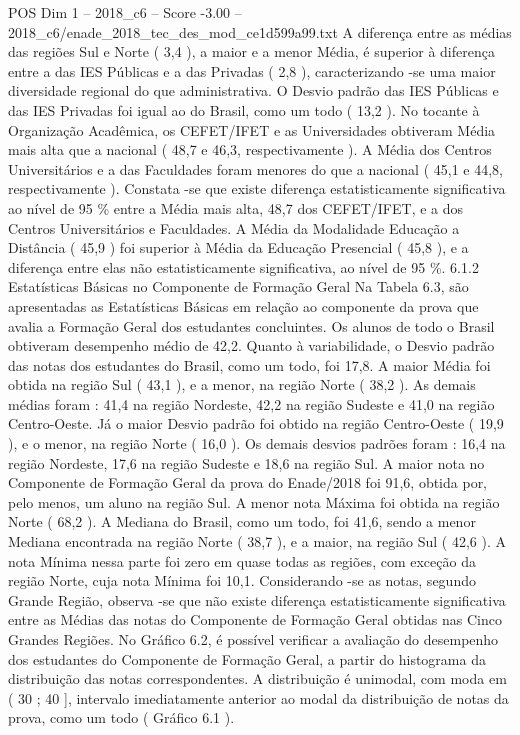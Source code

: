 \begin{textsample}{POS Dim 1 – 2018\_c6 – Score -3.00 – 2018\_c6/enade\_2018\_tec\_des\_mod\_ce1d599a99.txt}
A diferença entre as médias das regiões Sul e Norte ( 3,4 ), a maior e a menor Média, é superior à diferença entre a das IES Públicas e a das Privadas ( 2,8 ), caracterizando -se uma maior diversidade regional do que administrativa.
O Desvio padrão das IES Públicas e das IES Privadas foi igual ao do Brasil, como um todo ( 13,2 ).
No tocante à Organização Acadêmica, os CEFET/IFET e as Universidades obtiveram Média mais alta que a nacional ( 48,7 e 46,3, respectivamente ).
A Média dos Centros Universitários e a das Faculdades foram menores do que a nacional ( 45,1 e 44,8, respectivamente ).
Constata -se que existe diferença estatisticamente significativa ao nível de 95 \% entre a Média mais alta, 48,7 dos CEFET/IFET, e a dos Centros Universitários e Faculdades.
A Média da Modalidade Educação a Distância ( 45,9 ) foi superior à Média da Educação Presencial ( 45,8 ), e a diferença entre elas não estatisticamente significativa, ao nível de 95 \%. 6.1.2 Estatísticas Básicas no Componente de Formação Geral Na Tabela 6.3, são apresentadas as Estatísticas Básicas em relação ao componente da prova que avalia a Formação Geral dos estudantes concluintes.
Os alunos de todo o Brasil obtiveram desempenho médio de 42,2.
Quanto à variabilidade, o Desvio padrão das notas dos estudantes do Brasil, como um todo, foi 17,8.
A maior Média foi obtida na região Sul ( 43,1 ), e a menor, na região Norte ( 38,2 ).
As demais médias foram : 41,4 na região Nordeste, 42,2 na região Sudeste e 41,0 na região Centro-Oeste.
Já o maior Desvio padrão foi obtido na região Centro-Oeste ( 19,9 ), e o menor, na região Norte ( 16,0 ).
Os demais desvios padrões foram : 16,4 na região Nordeste, 17,6 na região Sudeste e 18,6 na região Sul.
A maior nota no Componente de Formação Geral da prova do Enade/2018 foi 91,6, obtida por, pelo menos, um aluno na região Sul.
A menor nota Máxima foi obtida na região Norte ( 68,2 ).
A Mediana do Brasil, como um todo, foi 41,6, sendo a menor Mediana encontrada na região Norte ( 38,7 ), e a maior, na região Sul ( 42,6 ).
A nota Mínima nessa parte foi zero em quase todas as regiões, com exceção da região Norte, cuja nota Mínima foi 10,1.
Considerando -se as notas, segundo Grande Região, observa -se que não existe diferença estatisticamente significativa entre as Médias das notas do Componente de Formação Geral obtidas nas Cinco Grandes Regiões.
No Gráfico 6.2, é possível verificar a avaliação do desempenho dos estudantes do Componente de Formação Geral, a partir do histograma da distribuição das notas correspondentes.
A distribuição é unimodal, com moda em ( 30 ; 40 ], intervalo imediatamente anterior ao modal da distribuição de notas da prova, como um todo ( Gráfico 6.1 ).

\end{textsample}
